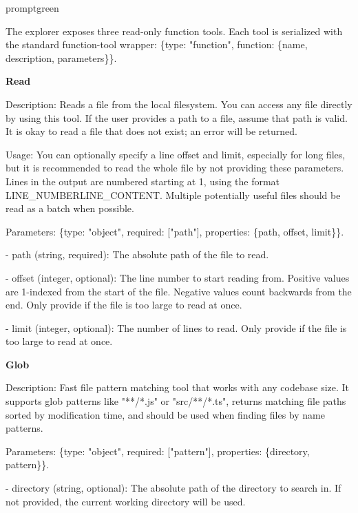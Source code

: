 \documentclass{llmxive}
\begin{document}
\begin{promptbox}{promptgreen}
{\ttfamily\tiny\sloppy
The explorer exposes three read-only function tools. Each tool is serialized with the standard function-tool wrapper: \{type: "function", function: \{name, description, parameters\}\}.\par
\vspace{0.35em}\par
\textbf{Read}\par
Description: Reads a file from the local filesystem. You can access any file directly by using this tool. If the user provides a path to a file, assume that path is valid. It is okay to read a file that does not exist; an error will be returned.\par
Usage: You can optionally specify a line offset and limit, especially for long files, but it is recommended to read the whole file by not providing these parameters. Lines in the output are numbered starting at 1, using the format LINE\_NUMBER\textbar{}LINE\_CONTENT. Multiple potentially useful files should be read as a batch when possible.\par
Parameters: \{type: "object", required: ["path"], properties: \{path, offset, limit\}\}.\par
- path (string, required): The absolute path of the file to read.\par
- offset (integer, optional): The line number to start reading from. Positive values are 1-indexed from the start of the file. Negative values count backwards from the end. Only provide if the file is too large to read at once.\par
- limit (integer, optional): The number of lines to read. Only provide if the file is too large to read at once.\par
\vspace{0.35em}\par
\textbf{Glob}\par
Description: Fast file pattern matching tool that works with any codebase size. It supports glob patterns like "**/*.js" or "src/**/*.ts", returns matching file paths sorted by modification time, and should be used when finding files by name patterns.\par
Parameters: \{type: "object", required: ["pattern"], properties: \{directory, pattern\}\}.\par
- directory (string, optional): The absolute path of the directory to search in. If not provided, the current working directory will be used.\par
}
\end{promptbox}
\end{document}
